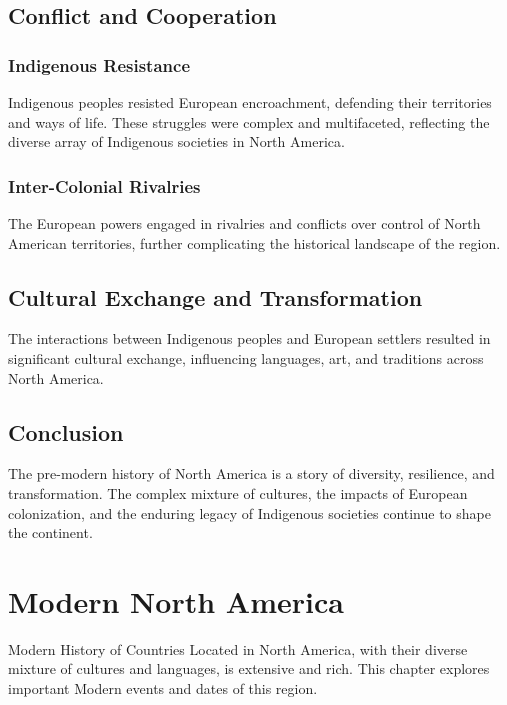 \documentclass[a4paper,12pt]{book}
\begin{document}
\section{Conflict and Cooperation}
\label{sec:conflict-cooperation}

\subsection{Indigenous Resistance}
Indigenous peoples resisted European encroachment, defending their territories and ways of life. These struggles were complex and multifaceted, reflecting the diverse array of Indigenous societies in North America.

\subsection{Inter-Colonial Rivalries}
The European powers engaged in rivalries and conflicts over control of North American territories, further complicating the historical landscape of the region.

\section{Cultural Exchange and Transformation}
\label{sec:cultural-exchange-transformation}
The interactions between Indigenous peoples and European settlers resulted in significant cultural exchange, influencing languages, art, and traditions across North America.

\section{Conclusion}
\label{sec:conclusion-north-america}
The pre-modern history of North America is a story of diversity, resilience, and transformation. The complex mixture of cultures, the impacts of European colonization, and the enduring legacy of Indigenous societies continue to shape the continent.

\chapter{Modern North America}
\label{ch:modern-history-north-america}

Modern History of Countries Located in North America, with their diverse mixture of cultures and languages, is extensive and rich. This chapter explores important Modern events and dates of this region.
\end{document}

